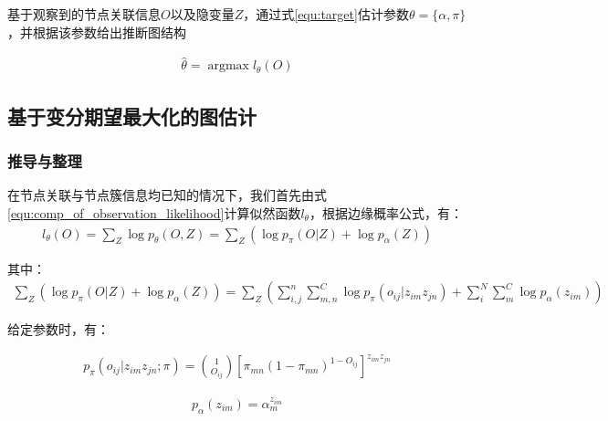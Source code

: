 基于观察到的节点关联信息$O$以及隐变量$Z$，通过式\ref{equ:target}估计参数$\theta=\{\alpha,\pi\}$，并根据该参数给出推断图结构

\begin{equation}\label{equ:target}
  \begin{aligned}
    \hat{\theta}=\mathop{\arg\max} l_\theta(O)
  \end{aligned}
\end{equation}

\subsection{基于变分期望最大化的图估计}

\subsubsection{推导与整理}

在节点关联与节点簇信息均已知的情况下，我们首先由式\ref{equ:comp_of_observation_likelihood}计算似然函数$l_{\theta}$，根据边缘概率公式，有：
\begin{equation}\label{equ:comp_of_observation_likelihood}
  \begin{aligned}
    l_\theta(O)=\sum_{Z}\log p_\theta(O,Z)=\sum_Z(\log p_{\pi}(O|Z) +\log p_\alpha(Z))
  \end{aligned}
\end{equation}

其中：
\begin{equation}\label{equ:comp_of_observation_likelihood1}
  \begin{aligned}
\sum_Z(\log p_{\pi}(O|Z)+\log p_\alpha(Z))=\sum_Z(\sum_{i,j}^{n}\sum_{m,n}^C\log p_\pi(o_{ij}|z_{im}z_{jn})
+\sum_{i}^N\sum_m^C\log p_\alpha(z_{im}))
  \end{aligned}
\end{equation}

给定参数时，有：

\begin{equation}\label{equ:comp_of_observation_likelihood2}
  \begin{aligned}
p_\pi(o_{ij}|z_{im}z_{jn};\pi)=\binom{1}{O_{ij}}[\pi_{mn}(1-\pi_{mn})^{1-O_{ij}}]^{ z_{im}z_{jn}}
  \end{aligned}
\end{equation}

\begin{equation}\label{equ:comp_of_observation_likelihood3}
  \begin{aligned}
p_\alpha(z_{im})=\alpha_m^{z_{im}} 
  \end{aligned}
\end{equation}

